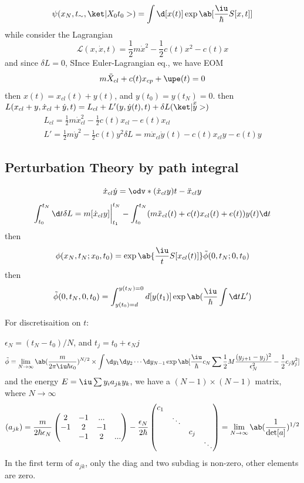 \[
  \psi(x_N, t_\sim, \ket|X_0t_0>)
= \int\d[x(t)] \exp\ab[\frac\iu\hbar S[x,t]]
\]
while consider the Lagrangian
\[
  \mathcal L(x,\dot x,t) = \frac12m\dot x^2 - \frac12 c(t)x^2 - c(t)x
\]
and since $\delta L = 0$, SInce Euler-Lagrangian eq., we have EOM
\[
  m\ddot X_{cl} + c(t) x_{cp} + \upe(t) = 0
\]
then $x(t) = x_{cl}(t) + y(t)$, and
$y(t_0) = y(t_N) = 0$.
then $L(x_{cl}+y,\dot x_{cl} + \dot y,t) = L_{cl}
+ L'(y,\dot y(t), t) + \delta L(\ket|\overset xy>)$
\begin{gather*}
  L_{cl} = \frac12 m\dot x_{cl}^2 - \frac12 c(t) x_{cl} - e(t) x_{cl}\\
  L' = \frac12 m\dot y^2 - \frac12 c(t) y^2
  \delta L = m\dot x_{cl} \dot y(t) - c(t) x_{cl} y - e(t) y
\end{gather*}

\subsection{Perturbation Theory by path integral}

\[
  \dot x_{cl}
 \dot y = \odv*{(\dot x_{cl}y)}t - \ddot x_{cl}y\]
 \[
  \int_{t_0}^{t_N} \d t \delta L = m [\dot x_{cl}y]\bigg|_{t_1}^{t_N}
  - \int_{t_0}^{t_N} (m\ddot x_{cl}(t) + c(t) x_{cl}(t) + e(t)) y(t) \d t
 \]
 then
\[
  \phi(x_N,t_N;x_0,t_0) = \exp\ab\{\frac\iu t S[x_{cl}(t)]\}
  \tilde\phi(0,t_N;0,t_0)
\]
then
\[
  \tilde\phi(0,t_N,0,t_0) = \int_{y(t_0)=d}^{y(t_N) = 0}
  d[y(t_1)] \exp\ab(\frac\iu\hbar \int \d t L')
\]

For discretisaition on $t$:

$\epsilon_N = (t_N - t_0)/N$, and $t_j = t_0 + \epsilon_N j$
\[
  \tilde \phi = \lim_{N \to\infty}
  \ab(\frac{m}{2\pi\iu\hbar\epsilon_0})^{N/2}\times
  \int \d y_1 \d y_2 \cdots \d y_{N-1}
  \exp\ab[\frac\iu\hbar c_N
  \sum\frac12 M\frac{(y_{j+1}-y_j)^2}{\epsilon_N^2} - \frac12 c_jy_j^2]
\]
and the energy $E = \iu\sum y_i a_{jk} y_k$, we have a $(N - 1) \times (N - 1)$ matrix, where $N \to \infty$
\[
  (a_{jk}) = \frac{m}{2\hbar\epsilon_N}
  \begin{pmatrix}
    2 & -1 & ...\\
    -1 & 2 & -1\\
       &  -1 & 2 & ...
  \end{pmatrix}
  -\frac{\epsilon_N}{2\hbar}
  \begin{pmatrix}
    c_1 \\
    & \ddots\\
    & & c_j\\
    & & & \ddots
  \end{pmatrix}
  = \lim_{N \to \infty}
  \ab(\frac{1}{\det[a]})^{1/2}
\]
In the first term of $a_{jk}$, only the diag and two subdiag is non-zero, other elements are zero.

